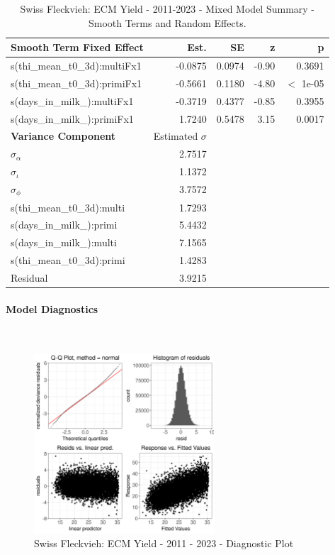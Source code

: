 \newpage
\begin{table}[H]
\centering
\begin{tabular}
{l | r | r | r | r}
\textbf{Smooth Term Fixed Effect} & Est. & SE & z & p\\
\hline
\hline
s(thi\_mean\_t0\_3d):multiFx1 & -0.0875 & 0.0974 & -0.90 & 0.3691\\
s(thi\_mean\_t0\_3d):primiFx1 & -0.5661 & 0.1180 & -4.80 & $<$ 1e-05\\
s(days\_in\_milk\_):multiFx1 & -0.3719 & 0.4377 & -0.85 & 0.3955\\
s(days\_in\_milk\_):primiFx1 & 1.7240 & 0.5478 & 3.15 & 0.0017\\
\hline
\textbf{Variance Component} & Estimated $\sigma$ & & & \\
\hline
\hline
$\sigma_\alpha$ & 2.7517 & & & \\
$\sigma_\iota$ & 1.1372 & & & \\
$\sigma_\phi$ & 3.7572 & & & \\
s(thi\_mean\_t0\_3d):multi & 1.7293 & & & \\
s(days\_in\_milk\_):primi & 5.4432 & & & \\
s(days\_in\_milk\_):multi & 7.1565 & & & \\
s(thi\_mean\_t0\_3d):primi & 1.4283 & & & \\
Residual & 3.9215 & & & \\
\end{tabular}
\caption[]{Swiss Fleckvieh: ECM Yield - 2011-2023 - Mixed Model Summary - Smooth Terms and Random Effects.}
\end{table}


\paragraph{Model Diagnostics} \quad \\
\begin{figure}[H]
    \centering
    \includegraphics[width=0.6\textwidth]{thesis/figures/models/ecm/after2010/sf_ecm_after2010/sf_ecm_after2010_diagnostics.png}
    \caption[]{Swiss Fleckvieh: ECM Yield - 2011 - 2023 - Diagnostic Plot}
\end{figure}

